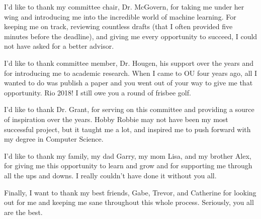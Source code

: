 
I'd like to thank my committee chair, Dr. McGovern, for taking me under her wing and introducing me into the incredible world of machine learning. For keeping me on track, reviewing countless drafts (that I often provided five minutes before the deadline), and giving me every opportunity to succeed, I could not have asked for a better advisor. 

I'd like to thank committee member, Dr. Hougen, his support over the years and for introducing me to academic research. When I came to OU four years ago, all I wanted to do was publish a paper and you went out of your way to give me that opportunity. Rio 2018! I still owe you a round of frisbee golf.

I'd like to thank Dr. Grant, for serving on this committee and providing a source of inspiration over the years. Hobby Robbie may not have been my most successful project, but it taught me a lot, and inspired me to push forward with my degree in Computer Science.

I'd like to thank my family, my dad Garry, my mom Lisa, and my brother Alex, for giving me this opportunity to learn and grow and for supporting me through all the ups and downs. I really couldn't have done it without you all. 

Finally, I want to thank my best friends, Gabe, Trevor, and Catherine for looking out for me and keeping me sane throughout this whole process. Seriously, you all are the best. 
